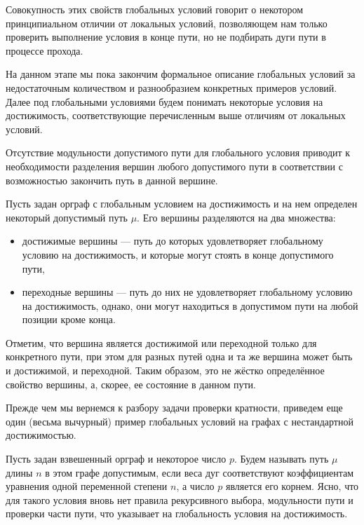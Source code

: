 Совокупность этих свойств глобальных условий говорит о некотором принципиальном отличии от локальных условий, позволяющем нам только проверить выполнение условия в конце пути, но не подбирать дуги пути в процессе прохода. 

На данном этапе мы пока закончим формальное описание глобальных условий за недостаточным количеством и разнообразием конкретных примеров условий. Далее под глобальными условиями будем понимать некоторые условия на достижимость, соответствующие перечисленным выше отличиям от локальных условий.   

Отсутствие модульности допустимого пути для глобального условия приводит к необходимости разделения вершин любого допустимого пути в соответствии с возможностью закончить путь в данной вершине. 

\begin{definition}
	Пусть задан орграф с глобальным условием на достижимость и на нем определен некоторый допустимый путь $\mu$. Его вершины разделяются на два множества:
	\begin{itemize}
		\item достижимые вершины --- путь до которых удовлетворяет глобальному условию на достижимость, и которые могут стоять в конце допустимого пути,
		\item переходные вершины --- путь до них не удовлетворяет глобальному условию на достижимость, однако, они могут находиться в допустимом пути на любой позиции кроме конца.
	\end{itemize}
\end{definition}

Отметим, что вершина является достижимой или переходной только для конкретного пути, при этом для разных путей одна и та же вершина может быть и достижимой, и переходной. Таким образом, это не жёстко определённое свойство вершины, а, скорее, ее состояние в данном пути. 

Прежде чем мы вернемся к разбору задачи проверки кратности, приведем еще один (весьма вычурный) пример глобальных условий на графах с нестандартной достижимостью.

Пусть задан взвешенный орграф и некоторое число $p$. Будем называть путь $\mu$ длины $n$ в этом графе допустимым, если веса дуг соответствуют коэффициентам уравнения одной переменной степени $n$, а число $p$ является его корнем. Ясно, что для такого условия вновь нет правила рекурсивного выбора, модульности пути и проверки части пути, что указывает на глобальность условия на достижимость. 

